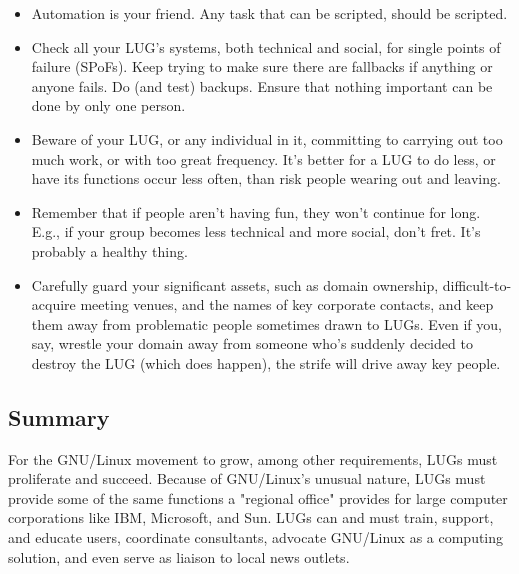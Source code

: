 \begin{itemize}
\item Automation is your friend.  Any task that can be scripted, 
should be scripted.
\item Check all your LUG's systems, both technical and social,
for single points of failure (SPoFs).  Keep trying to make sure there are
fallbacks if anything or anyone fails.  Do (and test) backups.  Ensure that nothing
important can be done by only one person.
\item Beware of your LUG, or any individual in it, committing 
to carrying out too much work, or with too great frequency.  It's 
better for a LUG to do less, or have its functions occur less often,
than risk people wearing out and leaving.
\item Remember that if people aren't having fun, they won't 
continue for long.  E.g., if your group becomes less technical and 
more social, don't fret.  It's probably a healthy thing.
\item Carefully guard your significant assets, such as domain
ownership, difficult-to-acquire meeting venues, and the names of key
corporate contacts, and keep them away from problematic people sometimes
drawn to LUGs.  Even if you, say, wrestle your domain away from someone
who's suddenly decided to destroy the LUG (which does happen), the
strife will drive away key people.
\end{itemize}







\subsection{Summary}

For the GNU/Linux movement to grow, among other requirements,
LUGs must proliferate and succeed.  Because of GNU/Linux's
unusual nature, LUGs must provide some of the same functions a "regional
office" provides for large computer corporations like IBM, Microsoft,
and Sun. LUGs can and must train, support, and educate users,
coordinate consultants, advocate GNU/Linux as a computing solution,
and even serve as liaison to local news outlets.



